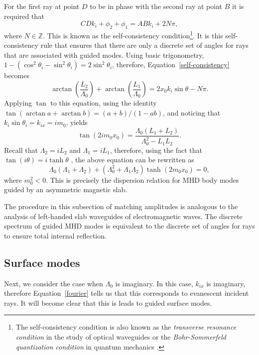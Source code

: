 	For the first ray at point $D$ to be in phase with the second ray at point $B$ it is required that
	\begin{equation}
	CD k_i  + \phi_2 + \phi_1 = AB k_i + 2N\pi, \label{self-consistency}
	\end{equation}
	where $N \in \mathbb{Z}$.
	This is known as the self-consistency condition\footnote{The self-consistency condition is also known as the \textit{transverse resonance condition} in the study of optical waveguides \citep{sym_etal92} or the \textit{Bohr-Sommerfeld quantization condition} in quantum mechanics \citep{mes61}.}. It is this self-consistency rule that ensures that there are only a discrete set of angles for rays that are associated with guided modes. Using basic trigonometry, $1 - (\cos^2{\theta_i} - \sin^2{\theta_i}) = 2\sin^2{\theta_i}$, therefore, Equation~\eqref{self-consistency} becomes
	\begin{equation}
	\arctan\left(\frac{L_2}{\Lambda_0}\right) + \arctan\left(\frac{L_1}{\Lambda_0}\right) = 2x_0k_i \sin{\theta} - N\pi.
	\end{equation}
	Applying $\tan$ to this equation, using the identity $\tan(\arctan{a} + \arctan{b}) = (a + b) / (1 - ab)$, and noticing that $k_i\sin{\theta_i} = k_{ix} = im_0$, yields
	\begin{equation}
	\tan(2im_0x_0) = \frac{\Lambda_0 (L_1 + L_2)}{\Lambda_0^2 - L_1L_2}.
	\end{equation}
	Recall that $\Lambda_2 = iL_2$ and $\Lambda_1 = iL_1$, therefore, using the fact that $\tan(i\theta) = i\tanh{\theta}$ \citep{abr_etal65}, the above equation can be rewritten as
	\begin{equation}
	\Lambda_0 (\Lambda_1 + \Lambda_2) + (\Lambda_0^2 + \Lambda_1\Lambda_2)\tanh(2m_0x_0) = 0,
	\end{equation}
	where $m_0^2 < 0$. This is precisely the dispersion relation for MHD body modes guided by an asymmetric magnetic slab.
	
	The procedure in this subsection of matching amplitudes is analogous to the analysis of left-handed slab waveguides of electromagnetic waves. The discrete spectrum of guided MHD modes is equivalent to the discrete set of angles for rays to ensure total internal reflection.
	
	
	\subsection{Surface modes}
	Next, we consider the case when $\Lambda_0$ is imaginary. In this case, $k_{ix}$ is imaginary, therefore Equation~\eqref{fourier} tells us that this corresponds to evanescent incident rays. It will become clear that this is leads to guided surface modes.
	
